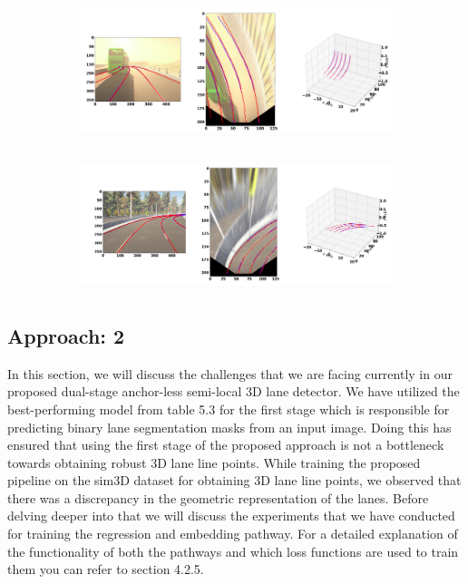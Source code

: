 \begin{figure}[h]
      \caption{Qualitative results of the  GenLaneNet\cite{guo2020gen} trained with complex binary lane segmentation architecture on visually varied scenes from sim3D\cite{guo2020gen} dataset: (a) uphill (b) downhill scenario}
        \centering
        \begin{subfigure}{0.6\textwidth}
        \includegraphics[width=1\linewidth, height=4cm]{images/uphill_illus.png} 
        \caption{}
        \label{fig:subim1}
        \end{subfigure}
        \begin{subfigure}{0.6\textwidth}
        \includegraphics[width=1\linewidth,height=4cm]{images/downhill_illus.png}
        \caption{}
        \label{fig:subim2}
        \end{subfigure}
        \end{figure}
        
        
\subsection{Approach: 2}
In this section, we will discuss the challenges that we are facing currently in our proposed dual-stage anchor-less semi-local 3D lane detector. We have utilized the best-performing model from table 5.3 for the first stage which is responsible for predicting binary lane segmentation masks from an input image. Doing this has ensured that using the first stage of the proposed approach is not a bottleneck towards obtaining robust 3D lane line points. While training the proposed pipeline on the sim3D dataset for obtaining 3D lane line points, we observed that there was a discrepancy in the geometric representation of the lanes. Before delving deeper into that we will discuss the experiments that we have conducted for training the regression and embedding pathway. For a detailed explanation of the functionality of both the pathways and which loss functions are used to train them you can refer to section 4.2.5. 

